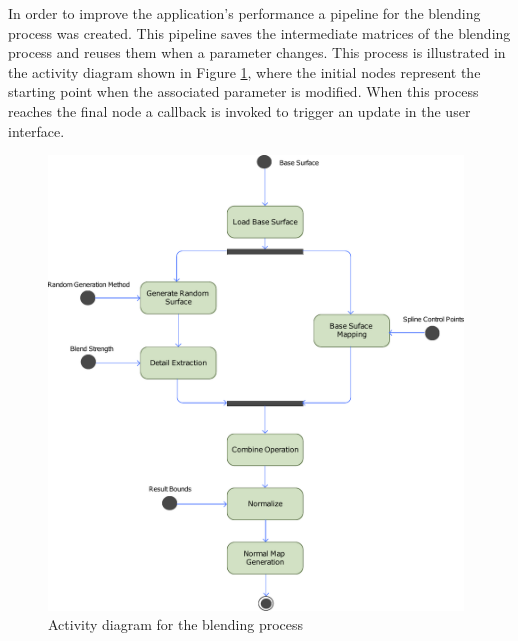       In order to improve the application's performance a pipeline for the blending process was created. This pipeline saves the intermediate matrices of the blending process and reuses them when a parameter changes. This process is illustrated in the activity diagram shown in Figure \ref{fig:activity_blending_process}, where the initial nodes represent the starting point when the associated parameter is modified. When this process reaches the final node a callback is invoked to trigger an update in the user interface.
      
      \begin{figure}[h]
      	\begin{center}
      	  \includegraphics[width=0.98\textwidth]{images/diagrams/blending_process.pdf}
      	\end{center}
        \caption{Activity diagram for the blending process}
        \label{fig:activity_blending_process}
      \end{figure} 
      